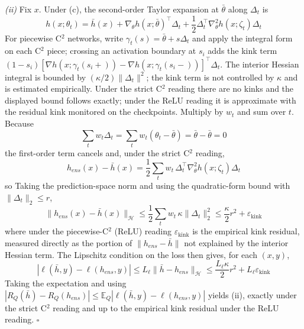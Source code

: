\documentclass[electronics,article,submit,moreauthors]{Definitions/mdpi}
\begin{document}
\emph{(ii)} Fix $x$. Under (c), the second-order Taylor expansion at $\bar\theta$ along $\Delta_t$ is
\begin{equation}
h(x;\theta_t)=\bar h(x)+\nabla_{\theta}h(x;\bar\theta)^{\top}\Delta_t+\frac{1}{2}\Delta_t^{\top}\nabla_{\theta}^{2}h(x;\zeta_t)\Delta_t
\end{equation}
For piecewise C$^2$ networks, write $\gamma_t(s)=\bar\theta+s\Delta_t$ and apply the integral form on each C$^2$ piece; crossing an activation boundary at $s_i$ adds the kink term $(1-s_i)[\nabla h(x;\gamma_t(s_i+))-\nabla h(x;\gamma_t(s_i-))]^{\top}\Delta_t$. The interior Hessian integral is bounded by $(\kappa/2)\|\Delta_t\|^2$; the kink term is not controlled by $\kappa$ and is estimated empirically. Under the strict C$^2$ reading there are no kinks and the displayed bound follows exactly; under the ReLU reading it is approximate with the residual kink monitored on the checkpoints. Multiply by $w_t$ and sum over $t$. Because
\begin{equation}
\sum_t w_t\Delta_t=\sum_t w_t(\theta_t-\bar\theta)=\bar\theta-\bar\theta=0
\end{equation}
the first-order term cancels and, under the strict C$^2$ reading,
\begin{equation}
h_{ens}(x)-\bar h(x)=\frac{1}{2}\sum_t w_t\,\Delta_t^{\top}\nabla_{\theta}^{2}h(x;\zeta_t)\Delta_t
\end{equation}
so Taking the prediction-space norm and using the quadratic-form bound with $\|\Delta_t\|_2\leq r$,
\begin{equation}
\|h_{ens}(x)-\bar h(x)\|_{\mathcal{H}}\leq\frac{1}{2}\sum_t w_t\,\kappa\|\Delta_t\|_2^{2}\leq\frac{\kappa}{2}r^{2}+\varepsilon_{\mathrm{kink}}
\end{equation}
where under the piecewise-C$^2$ (ReLU) reading $\varepsilon_{\mathrm{kink}}$ is the empirical kink residual, measured directly as the portion of $\|h_{ens}-\bar h\|$ not explained by the interior Hessian term. The Lipschitz condition on the loss then gives, for each $(x,y)$,
\begin{equation}
|\ell(\bar h,y)-\ell(h_{ens},y)|\leq L_{\ell}\|\bar h-h_{ens}\|_{\mathcal{H}}\leq\frac{L_{\ell}\kappa}{2}r^{2}+L_{\ell}\varepsilon_{\mathrm{kink}}
\end{equation}
Taking the expectation and using $|R_Q(\bar h)-R_Q(h_{ens})|\leq\mathbb{E}_Q|\ell(\bar h,y)-\ell(h_{ens},y)|$ yields (ii), exactly under the strict C$^2$ reading and up to the empirical kink residual under the ReLU reading. \hfill$\square$
\end{document}
